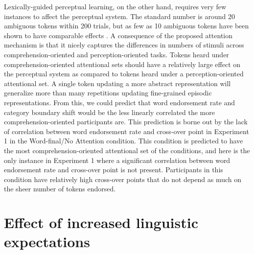 Lexically-guided perceptual learning, on the other hand, requires very few instances to affect the perceptual system.
The standard number is around 20 ambiguous tokens within 200 trials, but as few as 10 ambiguous tokens have been shown to have comparable effects \citep{Kraljic2008}.
A consequence of the proposed attention mechanism is that it nicely captures the differences in numbers of stimuli across comprehension-oriented and perception-oriented tasks.
Tokens heard under comprehension-oriented attentional sets should have a relatively large effect on the perceptual system as compared to tokens heard under a perception-oriented attentional set.
A single token updating a more abstract representation will generalize more than many repetitions updating fine-grained episodic representations.
From this, we could predict that word endorsement rate and category boundary shift would be the less linearly correlated the more comprehension-oriented participants are.
This prediction is borne out by the lack of correlation between word endorsement rate and cross-over point in Experiment 1 in the Word-final/No Attention condition.
This condition is predicted to have the most comprehension-oriented attentional set of the conditions, and here is the only instance in Experiment 1 where a significant correlation between word endorsement rate and cross-over point is not present.
Participants in this condition have relatively high cross-over points that do not depend as much on the sheer number of tokens endorsed.

\section{Effect of increased linguistic expectations}

